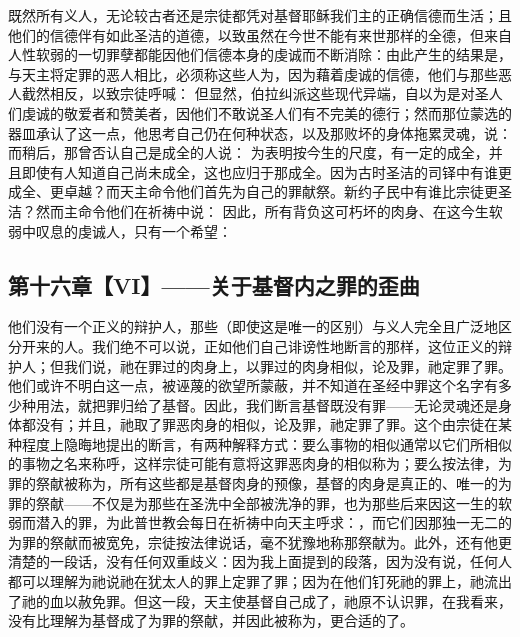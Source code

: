 既然所有义人，无论较古者还是宗徒都凭对基督耶稣我们主的正确信德而生活；且他们的信德伴有如此圣洁的道德，以致虽然在今世不能有来世那样的全德，但来自人性软弱的一切罪孽都能因他们信德本身的虔诚而不断消除：由此产生的结果是，与天主将定罪的恶人相比，必须称这些人为，因为藉着虔诚的信德，他们与那些恶人截然相反，以致宗徒呼喊：  但显然，伯拉纠派这些现代异端，自以为是对圣人们虔诚的敬爱者和赞美者，因他们不敢说圣人们有不完美的德行；然而那位蒙选的器皿承认了这一点，他思考自己仍在何种状态，以及那败坏的身体拖累灵魂，说：  而稍后，那曾否认自己是成全的人说：  为表明按今生的尺度，有一定的成全，并且即使有人知道自己尚未成全，这也应归于那成全。因为古时圣洁的司铎中有谁更成全、更卓越？而天主命令他们首先为自己的罪献祭。新约子民中有谁比宗徒更圣洁？然而主命令他们在祈祷中说： 因此，所有背负这可朽坏的肉身、在这今生软弱中叹息的虔诚人，只有一个希望： \par


\subsection{第十六章【VI】——关于基督内之罪的歪曲}

他们没有一个正义的辩护人，那些（即使这是唯一的区别）与义人完全且广泛地区分开来的人。我们绝不可以说，正如他们自己诽谤性地断言的那样，这位正义的辩护人；但我们说，祂在罪过的肉身上，以罪过的肉身相似，论及罪，祂定罪了罪。他们或许不明白这一点，被诬蔑的欲望所蒙蔽，并不知道在圣经中罪这个名字有多少种用法，就把罪归给了基督。因此，我们断言基督既没有罪——无论灵魂还是身体都没有；并且，祂取了罪恶肉身的相似，论及罪，祂定罪了罪。这个由宗徒在某种程度上隐晦地提出的断言，有两种解释方式：要么事物的相似通常以它们所相似的事物之名来称呼，这样宗徒可能有意将这罪恶肉身的相似称为；要么按法律，为罪的祭献被称为，所有这些都是基督肉身的预像，基督的肉身是真正的、唯一的为罪的祭献——不仅是为那些在圣洗中全部被洗净的罪，也为那些后来因这一生的软弱而潜入的罪，为此普世教会每日在祈祷中向天主呼求：，而它们因那独一无二的为罪的祭献而被宽免，宗徒按法律说话，毫不犹豫地称那祭献为。此外，还有他更清楚的一段话，没有任何双重歧义：因为我上面提到的段落，因为没有说，任何人都可以理解为祂说祂在犹太人的罪上定罪了罪；因为在他们钉死祂的罪上，祂流出了祂的血以赦免罪。但这一段，天主使基督自己成了，祂原不认识罪，在我看来，没有比理解为基督成了为罪的祭献，并因此被称为，更合适的了。\par

